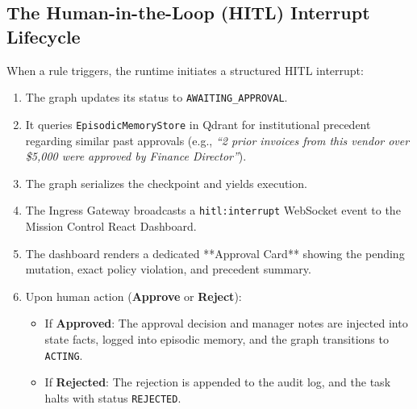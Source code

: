 \subsection{The Human-in-the-Loop (HITL) Interrupt Lifecycle}
When a rule triggers, the runtime initiates a structured HITL interrupt:
\begin{enumerate}
  \item The graph updates its status to \texttt{AWAITING\_APPROVAL}.
  \item It queries \texttt{EpisodicMemoryStore} in Qdrant for institutional precedent regarding similar past approvals (e.g., \textit{``2 prior invoices from this vendor over \$5,000 were approved by Finance Director''}).
  \item The graph serializes the checkpoint and yields execution.
  \item The Ingress Gateway broadcasts a \texttt{hitl:interrupt} WebSocket event to the Mission Control React Dashboard.
  \item The dashboard renders a dedicated **Approval Card** showing the pending mutation, exact policy violation, and precedent summary.
  \item Upon human action (\textbf{Approve} or \textbf{Reject}):
    \begin{itemize}
      \item If \textbf{Approved}: The approval decision and manager notes are injected into state facts, logged into episodic memory, and the graph transitions to \texttt{ACTING}.
      \item If \textbf{Rejected}: The rejection is appended to the audit log, and the task halts with status \texttt{REJECTED}.
    \end{itemize}
\end{enumerate}
